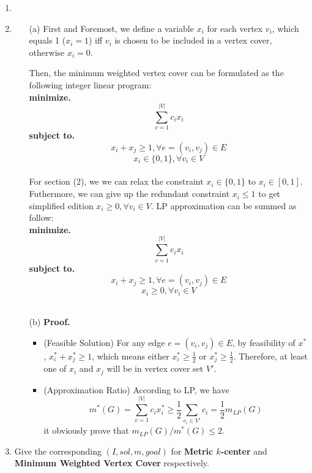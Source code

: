 \documentclass[12pt,a4paper]{article}
\makeatletter
\newtheorem*{solution}{Solution}
\theoremstyle{definition}
\renewenvironment{solution}[1][Solution] {\par\pushQED{\qed}\normalfont\topsep6\p@\@plus6\p@\relax\trivlist\item[\hskip\labelsep\bfseries#1\@addpunct{.}]\ignorespaces}{\popQED\endtrivlist\@endpefalse} \makeatother
\makeatother
\begin{document}
\begin{enumerate}
\begin{enumerate}
    \end{enumerate}

    \begin{solution}\item
    \renewcommand{\qedsymbol}{}
    \begin{itemize}
    \item [(a)] First and Foremost, we define a variable $x_{i}$ for each vertex $v_{i}$, which equals 1 ($x_{i}=1$) iff $v_{i}$ is chosen to be included in a vertex cover, otherwise $x_{i}=0$.\par Then, the minimum weighted vertex cover can be formulated as the following integer linear program: \\

    \qquad\textbf{minimize.}
    $$\sum_{v=1}^{|V|}c_{i}x_{i} $$
    \qquad\textbf{subject to.}
    $$x_{i}+x_{j} \geq 1, \forall e=(v_i,v_j)\in E$$
    $$x_{i}\in \{0,1\}, \forall v_i\in V $$\\

    For section (2), we we can relax the constraint $x_{i}\in \{0,1\}$ to $x_{i}\in [0,1]$. Futhermore, we can give up the redundant constraint $x_{i}\leq 1$ to get  simplified edition $x_{i}\geq 0, \forall v_i\in V $. LP approximation can be summed as follow:\\

    \qquad\textbf{minimize.}
    $$\sum_{v=1}^{|V|}c_{i}x_{i} $$
    \qquad\textbf{subject to.}
    $$x_{i}+x_{j} \geq 1, \forall e=(v_i,v_j)\in E$$
    $$x_{i}\geq 0, \forall v_i\in V$$\\
    \item [(b)] \textbf{Proof.}\par
    \begin{itemize}
    \item (Feasible Solution) For any edge $e = (v_i, v_j) \in E$, by feasibility of $x^*$, $x_{i}^*+x_{j}^* \geq 1$, which means either $x_{i}^*\geq 
    \frac{1}{2}$ or $x_{j}^*\geq \frac{1}{2}$. Therefore, at least one of $x_{i}$ and $x_{j} $ will be in vertex cover set $V'$.
    \item (Approximation Ratio) According to LP, we have
    $$m^*(G)=\sum_{v=1}^{|V|}c_{i}x_{i}^*\geq \frac{1}{2} \sum_{v_i\in V'}{c_{i}}=\frac{1}{2} m_{LP}(G) $$
    it obviously prove that
    $m_{LP}(G)/m^*(G) \leq 2$.
    \end{itemize}
    \end{itemize}
    \end{solution}

    \item
    Give the corresponding $(I,sol,m,goal)$ for \textbf{Metric $k$-center} and \textbf{Minimum Weighted Vertex Cover} respectively.


\end{enumerate}
\end{document}
